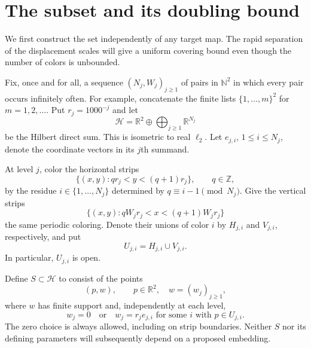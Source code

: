 \documentclass[11pt]{article}
\newcommand{\R}{\mathbb R}
\newcommand{\N}{\mathbb N}
\begin{document}
\section{The subset and its doubling bound}
\label{sec:construction}
We first construct the set independently of any target map. The rapid separation of the displacement scales will give a uniform covering bound even though the number of colors is unbounded.

Fix, once and for all, a sequence $(N_j,W_j)_{j\ge1}$ of pairs in $\N^2$ in which every pair occurs infinitely often. For example, concatenate the finite lists $\{1,\ldots,m\}^2$ for $m=1,2,\ldots$. Put $r_j=1000^{-j}$ and let
\[
 \mathcal H=\R^2\oplus\bigoplus_{j\ge1}\R^{N_j}
\]
be the Hilbert direct sum. This is isometric to real $\ell_2$. Let $e_{j,i}$, $1\le i\le N_j$, denote the coordinate vectors in its $j$th summand.

At level $j$, color the horizontal strips
\[
 \{(x,y):qr_j<y<(q+1)r_j\},\qquad q\in\mathbb Z,
\]
by the residue $i\in\{1,\ldots,N_j\}$ determined by $q\equiv i-1\pmod{N_j}$. Give the vertical strips
\[
 \{(x,y):qW_jr_j<x<(q+1)W_jr_j\}
\]
the same periodic coloring. Denote their unions of color $i$ by $H_{j,i}$ and $V_{j,i}$, respectively, and put
\[
 U_{j,i}=H_{j,i}\cup V_{j,i}.
\]
In particular, $U_{j,i}$ is open.

Define $S\subset\mathcal H$ to consist of the points
\begin{equation}\label{eq:set}
 (p,w),\qquad p\in\R^2,\quad w=(w_j)_{j\ge1},
\end{equation}
where $w$ has finite support and, independently at each level,
\[
 w_j=0\quad\text{or}\quad w_j=r_je_{j,i}\text{ for some }i\text{ with }p\in U_{j,i}.
\]
The zero choice is always allowed, including on strip boundaries. Neither $S$ nor its defining parameters will subsequently depend on a proposed embedding.
\end{document}
